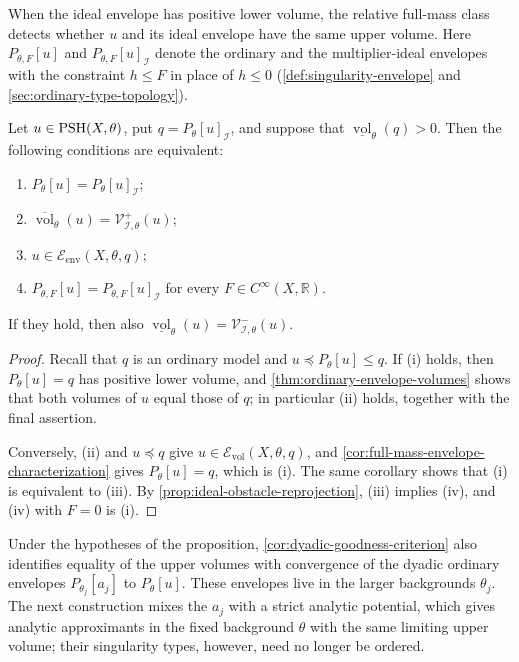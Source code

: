 When the ideal envelope has positive lower volume, the relative full-mass class detects whether $u$ and its ideal envelope have the same upper volume. Here $P_{\theta,F}[u]$ and $P_{\theta,F}[u]_{\mathcal I}$ denote the ordinary and the multiplier-ideal envelopes with the constraint $h\leq F$ in place of $h\leq0$ (\cref{def:singularity-envelope} and \cref{sec:ordinary-type-topology}).

\begin{proposition}\label{prop:conditional-i-characterization}
Let $u\in\mathrm{PSH}(X,\theta)$, put $q=P_\theta[u]_{\mathcal I}$, and suppose that $\underline{\operatorname{vol}}_\theta(q)>0$. Then the following conditions are equivalent:
\begin{enumerate}[label=\textup{(\roman*)},leftmargin=*,itemsep=.2em,topsep=.3em]
\item $P_\theta[u]=P_\theta[u]_{\mathcal I}$;
\item $\overline{\operatorname{vol}}_\theta(u)=\mathcal V^+_{\mathcal I,\theta}(u)$;
\item $u\in\mathcal E_{\mathrm{env}}(X,\theta,q)$;
\item $P_{\theta,F}[u]=P_{\theta,F}[u]_{\mathcal I}$ for every $F\in C^\infty(X,\mathbb R)$.
\end{enumerate}
If they hold, then also $\underline{\operatorname{vol}}_\theta(u)=\mathcal V^-_{\mathcal I,\theta}(u)$.
\end{proposition}
\begin{proof}
Recall that $q$ is an ordinary model and $u\preceq P_\theta[u]\leq q$. If (i) holds, then $P_\theta[u]=q$ has positive lower volume, and \cref{thm:ordinary-envelope-volumes} shows that both volumes of $u$ equal those of $q$; in particular (ii) holds, together with the final assertion.

Conversely, (ii) and $u\preceq q$ give $u\in\mathcal E_{\mathrm{vol}}(X,\theta,q)$, and \cref{cor:full-mass-envelope-characterization} gives $P_\theta[u]=q$, which is (i). The same corollary shows that (i) is equivalent to (iii). By \cref{prop:ideal-obstacle-reprojection}, (iii) implies (iv), and (iv) with $F=0$ is (i).
\end{proof}

Under the hypotheses of the proposition, \cref{cor:dyadic-goodness-criterion} also identifies equality of the upper volumes with convergence of the dyadic ordinary envelopes $P_{\theta_j}[a_j]$ to $P_\theta[u]$. These envelopes live in the larger backgrounds $\theta_j$. The next construction mixes the $a_j$ with a strict analytic potential, which gives analytic approximants in the fixed background $\theta$ with the same limiting upper volume; their singularity types, however, need no longer be ordered.


